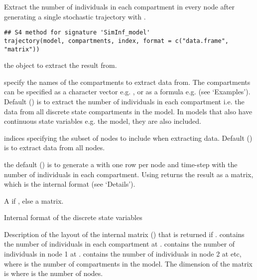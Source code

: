 \documentclass[letterpaper]{book}
\begin{document}
%
\begin{Description}
Extract the number of individuals in each compartment in every
node after generating a single stochastic trajectory with
.
\end{Description}
%
\begin{Usage}
\begin{verbatim}
## S4 method for signature 'SimInf_model'
trajectory(model, compartments, index, format = c("data.frame", "matrix"))
\end{verbatim}
\end{Usage}
%
\begin{Arguments}
\begin{ldescription}
\item[\code{model}] the  object to extract the result
from.

\item[\code{compartments}] specify the names of the compartments to
extract data from. The compartments can be specified as a
character vector e.g. ,
or as a formula e.g.  (see
`Examples'). Default () is to
extract the number of individuals in each compartment i.e. the
data from all discrete state compartments in the model. In
models that also have continuous state variables e.g. the
 model, they are also included.

\item[\code{index}] indices specifying the subset of nodes to include
when extracting data. Default () is to
extract data from all nodes.

\item[\code{format}] the default () is to
generate a  with one row per node and
time-step with the number of individuals in each
compartment. Using  returns the result
as a matrix, which is the internal format (see
`Details').
\end{ldescription}
\end{Arguments}
%
\begin{Value}
A  if , else
a matrix.
\end{Value}
%
\begin{Section}{Internal format of the discrete state variables}

Description of the layout of the internal matrix ()
that is returned if . 
contains the number of individuals in each compartment at
.  contains the number of
individuals in node 1 at .  contains the number of individuals in node 2 at
 etc, where  is the number of
compartments in the model. The dimension of the matrix is
  where  is
the number of nodes.
\end{Section}
\end{document}
